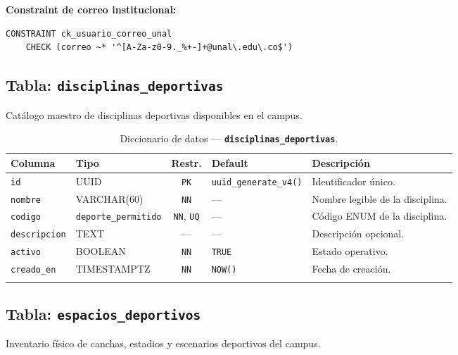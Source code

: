\documentclass[12pt, a4paper]{article}
\newcommand{\pk}{\texttt{PK}}
\newcommand{\uq}{\texttt{UQ}}
\newcommand{\nn}{\texttt{NN}}
\newcommand{\tname}[1]{\texttt{\textbf{#1}}}
\newcommand{\cname}[1]{\texttt{#1}}
\begin{document}
\textbf{Constraint de correo institucional:}
\begin{lstlisting}[caption={Validación de correo @unal.edu.co.}]
CONSTRAINT ck_usuario_correo_unal
    CHECK (correo ~* '^[A-Za-z0-9._%+-]+@unal\.edu\.co$')
\end{lstlisting}

\subsection{Tabla: \tname{disciplinas\_deportivas}}

Catálogo maestro de disciplinas deportivas disponibles en el campus.

\begin{longtable}{l l c l p{5cm}}
    \toprule
    \textbf{Columna} & \textbf{Tipo} & \textbf{Restr.} & \textbf{Default} & \textbf{Descripción} \\
    \midrule
    \endhead
    \cname{id} & UUID & \pk & \texttt{uuid\_generate\_v4()} & Identificador único. \\
    \cname{nombre} & VARCHAR(60) & \nn & --- & Nombre legible de la disciplina. \\
    \cname{codigo} & \texttt{deporte\_permitido} & \nn, \uq & --- & Código ENUM de la disciplina. \\
    \cname{descripcion} & TEXT & --- & --- & Descripción opcional. \\
    \cname{activo} & BOOLEAN & \nn & \texttt{TRUE} & Estado operativo. \\
    \cname{creado\_en} & TIMESTAMPTZ & \nn & \texttt{NOW()} & Fecha de creación. \\
    \bottomrule
    \caption{Diccionario de datos --- \tname{disciplinas\_deportivas}.}
\end{longtable}

\subsection{Tabla: \tname{espacios\_deportivos}}

Inventario físico de canchas, estadios y escenarios deportivos del campus.
\end{document}
